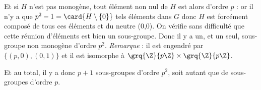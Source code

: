 \begin{enumerate}
 Et si $H$ n'est pas monogène, tout élément non nul de $H$ est alors d'ordre $p$ : or il n'y a que $p^2-1 = \card{H\setminus \{0\}}$ tels éléments dans $G$ donc $H$ est forcément composé de tous ces éléments et du neutre (0,0). On vérifie sans difficulté que cette réunion d'éléments est bien un sous-groupe. Donc il y a un, et un seul, sous-groupe non monogène d'ordre $p^2$. \textit{Remarque} : il est engendré par $\{(p,0),(0,1)\}$ et il est isomorphe à $\grq{\Z}{p\Z}\times \grq{\Z}{p\Z}$.
 
 Et au total, il y a donc $p+1$ sous-groupes d'ordre $p^2$, soit autant que de sous-groupes d'ordre $p$.
\end{enumerate}


